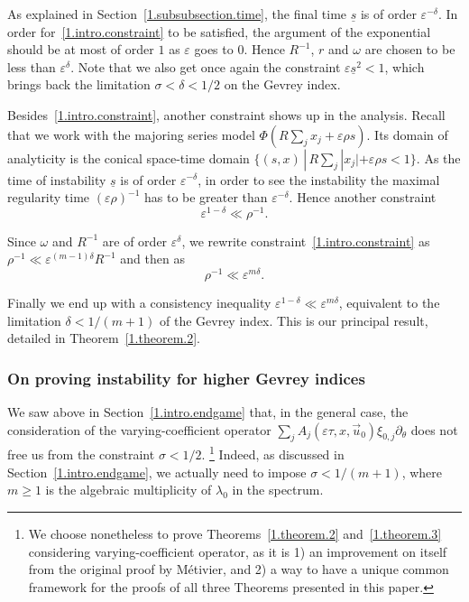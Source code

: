 \documentclass[10pt]{amsart}
\theoremstyle{definition}
\theoremstyle{plain}
\newcommand*\e{\varepsilon}
\newcommand{\dptl}{\partial}%
\newcommand*\und{\underline}
\begin{document}
As explained in Section~\ref{1.subsubsection.time}, the final time $\und{s}$ is of order $\e^{-\delta}$. In order for~\eqref{1.intro.constraint} to be satisfied, the argument of the exponential should be at most of order $1$ as $\e$ goes to $0$. Hence $R^{-1}$, $r$ and $\omega$ are chosen to be less than $\e^{\delta}$. Note that we also get once again the constraint $\e\und{s}^2 <1$, which brings back the limitation $\sigma < \delta < 1/2$ on the Gevrey index.

Besides~\eqref{1.intro.constraint}, another constraint shows up in the analysis. Recall that we work with the majoring series model $\Phi(R\sum_j x_j + \e\rho s)$. Its domain of analyticity is the conical space-time domain $\{ (s,x) \,|\, R\sum_j |x_j| + \e\rho s < 1 \}$. As the time of instability $\und{s}$ is of order $\e^{-\delta}$, in order to see the instability the maximal regularity time $(\e\rho)^{-1}$ has to be greater than $\e^{-\delta}$. Hence another constraint
\begin{equation}\label{1.intro.constraint.2}
\e^{1 - \delta} \ll \rho^{-1}.
\end{equation}

Since $\omega$ and $R^{-1}$ are of order $\e^{\delta}$, we rewrite constraint~\eqref{1.intro.constraint} as $\rho^{-1} \ll \e^{(m-1)\delta} R^{-1}$ and then as
\[
\rho^{-1} \ll \e^{m\delta}.
\]


Finally we end up with a consistency inequality $\e^{1-\delta} \ll \e^{m\delta}$, equivalent to the limitation $\delta < 1/(m+1)$ of the Gevrey index. This is our principal result, detailed in Theorem~\ref{1.theorem.2}.


\subsubsection{On proving instability for higher Gevrey indices}\label{1.intro.subsection.all.gevrey}

We saw above in Section~\ref{1.intro.endgame} that, in the general case, the consideration of the varying-coefficient operator $ \sum_j A_j(\e \tau,x,\vec{u}_0) \xi_{0,j} \dptl_{\theta} $ does not free us from the constraint $ \sigma < 1/2$.
\footnote{We choose nonetheless to prove Theorems~\ref{1.theorem.2} and~\ref{1.theorem.3} considering varying-coefficient operator, as it is 1) an improvement on itself from the original proof by Métivier, and 2) a way to have a unique common framework for the proofs of all three Theorems presented in this paper.}
Indeed, as discussed in Section~\ref{1.intro.endgame}, we actually need to impose $ \sigma < 1/(m+1)$, where $ m \geq 1$ is the algebraic multiplicity of $\lambda_0$ in the spectrum.
\end{document}
